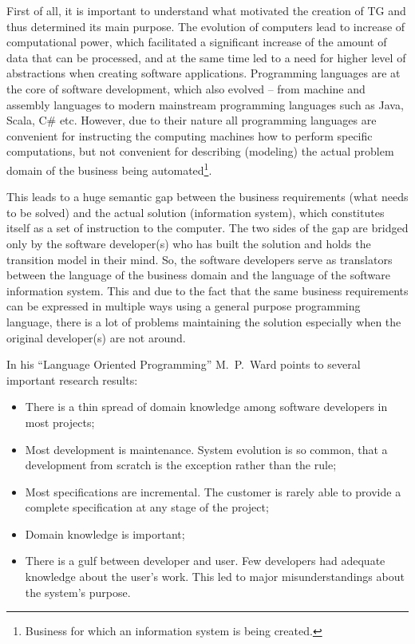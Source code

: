   First of all, it is important to understand what motivated the creation of TG and thus determined its main purpose.
  The evolution of computers lead to increase of computational power, which facilitated a significant increase of the amount of data that can be processed, and at the same time led to a need for higher level of abstractions when creating software applications.
  Programming languages are at the core of software development, which also evolved -- from machine and assembly languages to modern mainstream programming languages such as Java, Scala, C\# etc.
  However, due to their nature all programming languages are convenient for instructing the computing machines how to perform specific computations, but not convenient for describing (modeling) the actual problem domain of the business being automated\footnote{Business for which an information system is being created.}.
  
  This leads to a huge semantic gap between the business requirements (what needs to be solved) and the actual solution (information system), which constitutes itself as a set of instruction to the computer.
  The two sides of the gap are bridged only by the software developer(s) who has built the solution and holds the transition model in their mind.
  So, the software developers serve as translators between the language of the business domain and the language of the software information system.
  This and due to the fact that the same business requirements can be expressed in multiple ways using a general purpose programming language, there is a lot of problems maintaining the solution especially when the original developer(s) are not around.

  In his ``Language Oriented Programming'' M.~P.~Ward points to several important research results:
  \begin{itemize}
    \item There is a thin spread of domain knowledge among software developers in most projects;    
    \item Most development is maintenance. 
	  System evolution is so common, that a development from scratch is the exception rather than the rule;
    \item Most specifications are incremental. 
	  The customer is rarely able to provide a complete specification at any stage of the project;
    \item Domain knowledge is important;
    \item There is a gulf between developer and user. 
	  Few developers had adequate knowledge about the user's work. 
	  This led to major misunderstandings about the system's purpose.
  \end{itemize}
  
